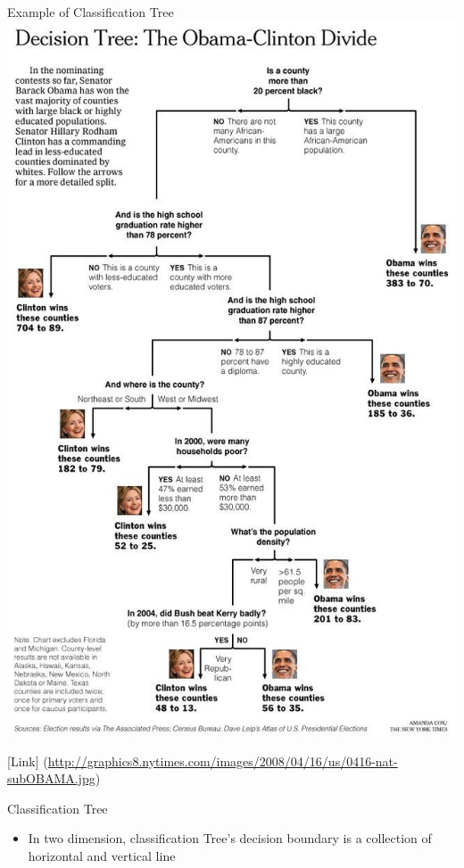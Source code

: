 \documentclass[
  ignorenonframetext,
]{beamer}
\providecommand{\tightlist}{%
  \setlength{\itemsep}{0pt}\setlength{\parskip}{0pt}}
\begin{document}
\begin{frame}{Example of Classification Tree}
\label{example-of-classification-tree}
\includegraphics{images/tree2.jpg}

{[}Link{]}
(\url{http://graphics8.nytimes.com/images/2008/04/16/us/0416-nat-subOBAMA.jpg})
\end{frame}

\begin{frame}{Classification Tree}
\label{classification-tree}
\begin{itemize}
\tightlist
\item
  In two dimension, classification Tree's decision boundary is a
  collection of horizontal and vertical line
\end{itemize}
\end{frame}
\end{document}
